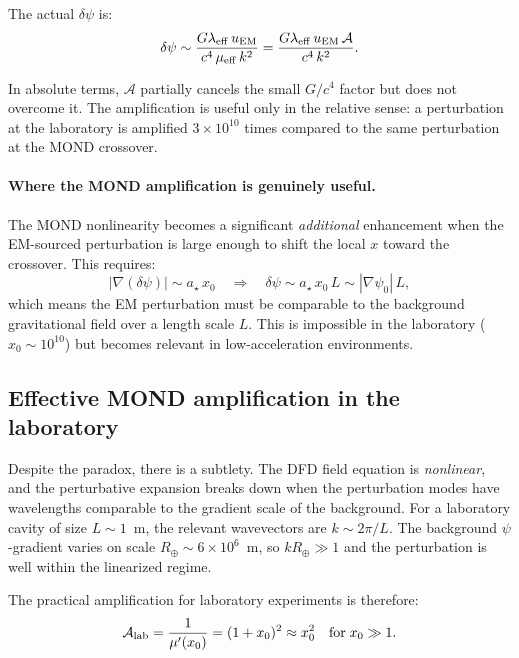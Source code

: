 \documentclass[12pt,aps,prd,twocolumn,superscriptaddress,nofootinbib]{revtex4-2}
\newcommand{\astar}{a_\star}
\newcommand{\lam}{\lambda}
\begin{document}
The actual $\delta\psi$ is:
\begin{equation}
\delta\psi \sim \frac{G\lam_{\rm eff}\,u_{\rm EM}}{c^4\,\mu_{\rm eff}\,k^2}
= \frac{G\lam_{\rm eff}\,u_{\rm EM}\,\mathcal{A}}{c^4\,k^2}.
\end{equation}

In absolute terms, $\mathcal{A}$ partially cancels the small
$G/c^4$ factor but does not overcome it. The amplification is
useful only in the relative sense: a perturbation at the laboratory
is amplified $3\times 10^{10}$ times compared to the same perturbation
at the MOND crossover.

\paragraph{Where the MOND amplification is genuinely useful.}
The MOND nonlinearity becomes a significant \emph{additional}
enhancement when the EM-sourced perturbation is large enough to
shift the local $x$ toward the crossover. This requires:
\begin{equation}
|\nabla(\delta\psi)| \sim \astar\,x_0
\quad\Rightarrow\quad
\delta\psi \sim \astar\,x_0\,L \sim |\nabla\psi_0|\,L,
\end{equation}
which means the EM perturbation must be comparable to the background
gravitational field over a length scale $L$. This is impossible in
the laboratory ($x_0 \sim 10^{10}$) but becomes relevant in
low-acceleration environments.

\subsection{Effective MOND amplification in the laboratory}
\label{sec:lab-MOND}

Despite the paradox, there is a subtlety. The DFD field equation is
\emph{nonlinear}, and the perturbative expansion breaks down when
the perturbation modes have wavelengths comparable to the gradient
scale of the background. For a laboratory cavity of size $L \sim 1$~m,
the relevant wavevectors are $k \sim 2\pi/L$. The background
$\psi$-gradient varies on scale $R_\oplus \sim 6\times10^6$~m, so
$kR_\oplus \gg 1$ and the perturbation is well within the linearized
regime.

The practical amplification for laboratory experiments is therefore:
\begin{equation}\label{eq:A-lab}
\mathcal{A}_{\rm lab} = \frac{1}{\mu'(x_0)}
= (1+x_0)^2 \approx x_0^2
\quad\text{for}\;x_0 \gg 1.
\end{equation}
\end{document}
